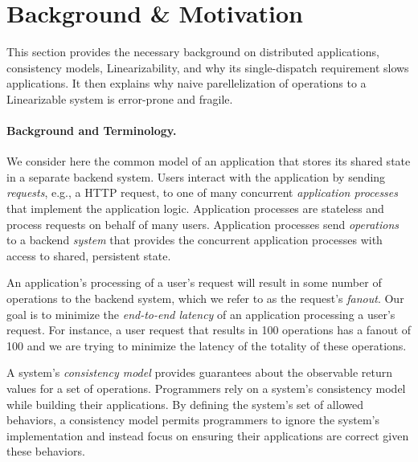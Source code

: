 

\section{Background \& Motivation}

This section provides the necessary background on distributed applications, consistency models, Linearizability, and why its single-dispatch requirement slows applications.
It then explains why naive parellelization of operations to a Linearizable system is error-prone and fragile.

\paragraph{Background and Terminology.}
We consider here the common model of an application that stores its shared state in a separate backend system.
Users interact with the application by sending \textit{requests}, e.g., a HTTP request, to one of many concurrent \textit{application processes} that implement the application logic. Application processes are stateless and process requests on behalf of many users. Application processes send \textit{operations} to a backend \textit{system} that provides the concurrent application processes with access to shared, persistent state.

An application's processing of a user's request will result in some number of operations to the backend system, which we refer to as the request's \textit{fanout}. Our goal is to minimize the \textit{end-to-end latency} of an application processing a user's request. For instance, a user request that results in 100 operations has a fanout of 100 and we are trying to minimize the latency of the totality of these operations.

A system's \textit{consistency model} provides guarantees about the observable return values for a set of operations.
Programmers rely on a system's consistency model while building their applications. By defining the system's set of allowed behaviors, a consistency model permits programmers to ignore the system's implementation and instead focus on ensuring their applications are correct given these behaviors.

